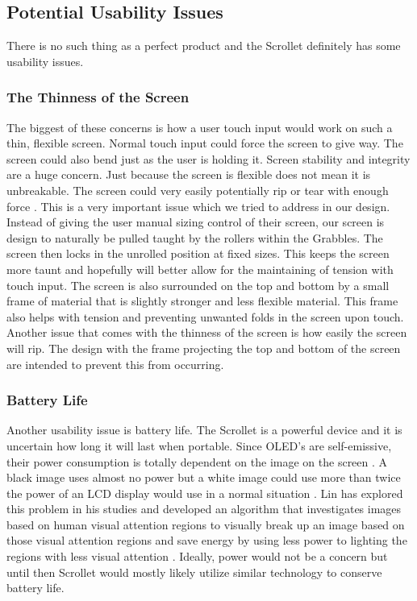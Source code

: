 \documentclass[a4paper]{article}
\begin{document}
\subsection{Potential Usability Issues}
There is no such thing as a perfect product and the Scrollet definitely has some usability issues.
\subsubsection{The Thinness of the Screen}
The biggest of these concerns is how a user touch input would work on such a thin, flexible screen. Normal touch input could force the screen to give way. \cite{Dijkstra} The screen could also bend just as the user is holding it. Screen stability and integrity are a huge concern. Just because the screen is flexible does not mean it is unbreakable. The screen could very easily potentially rip or tear with enough force \cite{Dijkstra}. This is a very important issue which we tried to address in our design. Instead of giving the user manual sizing control of their screen, our screen is design to naturally be pulled taught by the rollers within the Grabbles. The screen then locks in the unrolled position at fixed sizes. This keeps the screen more taunt and hopefully will better allow for the maintaining of tension with touch input. The screen is also surrounded on the top and bottom by a small frame of material that is slightly stronger and less flexible material. This frame also helps with tension and preventing unwanted folds in the screen upon touch. Another issue that comes with the thinness of the screen is how easily the screen will rip. The design with the frame projecting the top and bottom of the screen are intended to prevent this from occurring. 

\subsubsection{Battery Life}
Another usability issue is battery life. The Scrollet is a powerful device and it is uncertain how long it will last when portable. Since OLED's are self-emissive, their power consumption is totally dependent on the image on the screen \cite{Lin}. A black image uses almost no power but a white image could use more than twice the power of an LCD display would use in a normal situation \cite{Lin}. Lin has explored this problem in his studies and developed an algorithm that investigates images based on human visual attention regions to visually break up an image based on those visual attention regions and save energy by using less power to lighting the regions with less visual attention \cite{Lin}. Ideally, power would not be a concern but until then Scrollet would mostly likely utilize similar technology to conserve battery life.
\end{document}
